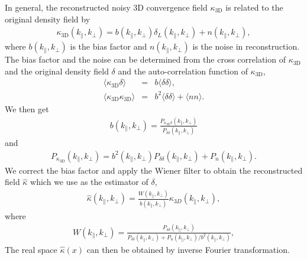 \documentclass[aps,prd,twocolumn,showpacs,superscriptaddress,groupedaddress,nofootinbib]{revtex4}  %
\newcommand{\mr}{\mathrm}
\begin{document}
In general, the reconstructed noisy 3D convergence field $\kappa_\mr{3D}$ is 
related to the original density field by
\begin{eqnarray}
\label{eq:kap3d}
\kappa_\mr{3D}(k_\parallel, k_\perp) = b(k_\parallel, k_\perp)
\delta_L(k_\parallel, k_\perp) + n(k_\parallel, k_\perp),
\end{eqnarray}
where $b(k_\parallel, k_\perp)$ is the bias factor and $n(k_\parallel,k_\perp)$
is the noise in reconstruction. The bias factor and the noise can be determined
from the cross correlation of $\kappa_\mr{3D}$ and the original density field
$\delta$ and the auto-correlation function of $\kappa_\mr{3D}$,
\begin{eqnarray}
\langle\kappa_\mr{3D}\delta\rangle&=&b\langle\delta\delta\rangle, \nonumber \\
\langle\kappa_\mr{3D}\kappa_\mr{3D}\rangle&=&b^2\langle\delta\delta\rangle+
\langle nn\rangle.
\end{eqnarray}
We then get 
\begin{eqnarray}
\label{eq:bias}
b(k_\parallel, k_\perp) = \frac{P_{\kappa_\mr{3D}\delta}(k_\parallel,k_\perp)}{
P_{\delta\delta}(k_\parallel,k_\perp)}
\end{eqnarray}
and 
\begin{eqnarray}
\label{eq:psnoise}
P_{\kappa_\mr{3D}}(k_\parallel,k_\perp)
=b^2(k_\parallel,k_\perp)P_{\delta\delta}(k_\parallel,k_\perp)+P_n(k_\parallel,k_\perp).
\end{eqnarray}
We correct the bias factor and apply the Wiener filter to obtain the 
reconstructed field $\hat{\kappa}$ which we use as the estimator of $\delta$, 
\begin{eqnarray}
\label{eq:kap}
\hat{\kappa}(k_\parallel,k_\perp)=\frac{W(k_\parallel,k_\perp)}{b(k_\parallel,k_\perp)} 
\kappa_{3D}(k_\parallel,k_\perp),
\end{eqnarray}
where
\begin{eqnarray}
W(k_\parallel,k_\perp)=\frac{P_{\delta\delta}(k_\parallel,k_\perp)}
{P_{\delta\delta}(k_\parallel,k_\perp)+P_{n}(k_\parallel,k_\perp)/b^2
(k_\parallel,k_\perp)},
\end{eqnarray}
The real space $\hat{\kappa}(x)$ can then be obtained by inverse Fourier transformation.
\end{document}

